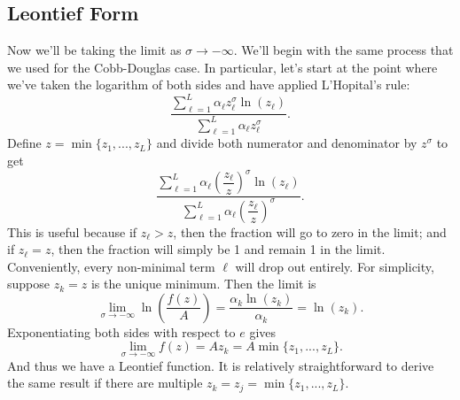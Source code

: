 \documentclass[12pt]{article}
\theoremstyle{definition}
\begin{document}
	
\subsection{Leontief Form}	

Now we'll be taking the limit as $\sigma \rightarrow -\infty$. We'll begin with the same process that we used for the Cobb-Douglas case. In particular, let's start at the point where we've taken the logarithm of both sides and have applied L'Hopital's rule:
	\[\frac{\sum_{\ell =1}^L \alpha_{\ell} z_{\ell}^\sigma \ln(z_{\ell}) }{\sum_{\ell = 1}^L \alpha_{\ell} z_{\ell}^{\sigma}}.	\]
Define $z = \min\{z_1, ..., z_L\}$ and divide both numerator and denominator by $z^{\sigma}$ to get
	\[\frac{\sum_{\ell =1}^L \alpha_{\ell} \left(\dfrac{z_{\ell}}{z}\right)^\sigma \ln(z_{\ell}) }{\sum_{\ell = 1}^L \alpha_{\ell} \left(\dfrac{z_{\ell}}{z}\right)^{\sigma}}.	\]
This is useful because if $z_{\ell} > z$, then the fraction will go to zero in the limit; and if $z_{\ell}=z$, then the fraction will simply be 1 and remain 1 in the limit. Conveniently, every non-minimal term ${\ell}$ will drop out entirely. For simplicity, suppose $z_k=z$ is the unique minimum. Then the limit is
	\[	\lim_{\sigma \rightarrow -\infty} \ln \left( \frac{f(z)}{A} \right) = \frac{\alpha_{k} \ln(z_{k}) }{\alpha_k} = \ln(z_k). \]
	Exponentiating both sides with respect to $e$ gives
		\[ \lim_{\sigma \rightarrow -\infty} f(z) = Az_k = A \min\{z_1, ..., z_L \}.	\]
And thus we have a Leontief function. It is relatively straightforward to derive the same result if there are multiple $z_k=z_j = \min\{z_1, ..., z_L\}$. 
\end{document}
